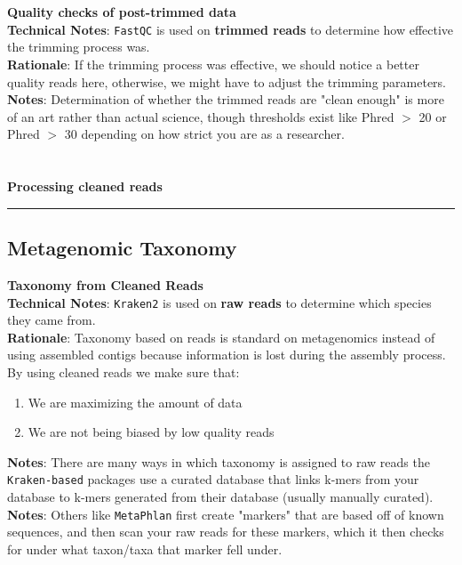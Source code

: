 \documentclass[11pt]{report}
\begin{document}
\\\\
\textbf{Quality checks of post-trimmed data} 
\\ \textbf{Technical Notes}: \texttt{FastQC} is used on \textbf{trimmed reads} to determine how effective the trimming process was. 
\\ \textbf{Rationale}: If the trimming process was effective, we should notice a better quality reads here, otherwise, we might have to adjust the trimming parameters. 
\\ \textbf{Notes}: Determination of whether the trimmed reads are "clean enough" is more of an art rather than actual science, though thresholds exist like Phred $>$ 20 or Phred $>$ 30 depending on how strict you are as a researcher. 
\\
\\
\\ 
\textbf{Processing cleaned reads} \\
\rule{\linewidth}{0.5mm}
\subsection{Metagenomic Taxonomy}	
\textbf{Taxonomy from Cleaned Reads} 
\\ \textbf{Technical Notes}: \texttt{Kraken2} is used on \textbf{raw reads} to determine which species they came from. 
\\ \textbf{Rationale}: Taxonomy based on reads is standard on metagenomics instead of using assembled contigs because information is lost during the assembly process. By using cleaned reads we make sure that: 
	 \begin{enumerate}
	 	\item We are maximizing the amount of data
	 	\item We are not being biased by low quality reads
	 \end{enumerate}
\textbf{Notes}: There are many ways in which taxonomy is assigned to raw reads the \texttt{Kraken-based} packages use a curated database that links k-mers from your database to k-mers generated from their database (usually manually curated).  
\\ \textbf{Notes}: Others like \texttt{MetaPhlan} first create "markers" that are based off of known sequences, and then scan your raw reads for these markers, which it then checks for under what taxon/taxa that marker fell under. \\
\end{document}
